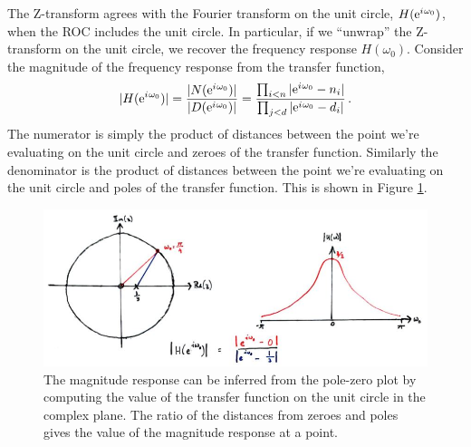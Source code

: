 The Z-transform agrees with the Fourier transform on the unit circle,
$H(\mathrm{e}^{{i\mkern1mu}\omega_0})$, when the ROC includes the unit circle. In particular,
if we ``unwrap'' the Z-transform on the unit circle, we recover the
frequency response $H(\omega_0)$. Consider the magnitude of the frequency
response from the transfer function,
%
\begin{displaymath}
  |H(\mathrm{e}^{{i\mkern1mu}\omega_0})| = \frac{|N(\mathrm{e}^{{i\mkern1mu}\omega_0})|}{|D(\mathrm{e}^{{i\mkern1mu}\omega_0})|}
  = \frac{\prod_{i<n}|\mathrm{e}^{{i\mkern1mu}\omega_0}-n_i|}{\prod_{j<d}|\mathrm{e}^{{i\mkern1mu}\omega_0}-d_i|} \,.
\end{displaymath}
%
The numerator is simply the product of distances between the point we're
evaluating on the unit circle and zeroes of the transfer function. Similarly
the denominator is the product of distances between the point we're
evaluating on the unit circle and poles of the transfer function. This is
shown in Figure \ref{fig::lecture_9_poles_zeroes}.
%
\begin{figure}[H]
  \includegraphics[width=\textwidth]{images/lecture_9_poles_zeroes.JPG}
  \caption{
    The magnitude response can be inferred from the pole-zero plot by
    computing the value of the transfer function on the unit circle in the
    complex plane. The ratio of the distances from zeroes and poles gives
    the value of the magnitude response at a point.
  }
  \label{fig::lecture_9_poles_zeroes}
\end{figure}
%
